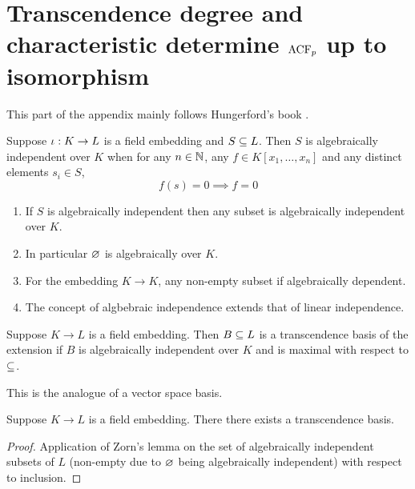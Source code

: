 \section{Transcendence degree and characteristic
determine \texorpdfstring{$\operatorname{ACF}_p$}{TEXT} up to isomorphism}
This part of the appendix mainly follows Hungerford's book \cite{hungerford}.
\begin{dfn}
    Suppose $\iota: K \to L$ is a field embedding
    and $S \subseteq L$.
    Then $S$ is algebraically independent over $K$
    when for any $n \in \mathbb{N}$, any $f \in K[x_1,\dots, x_n]$
    and any distinct elements $s_i \in S$, 
    \[f(s) = 0 \implies f = 0\]
\end{dfn}

\begin{rmk}
    \begin{enumerate}
        \item If $S$ is algebraically independent then any subset is 
        algebraically independent over $K$.
        \item In particular $\varnothing$ is algebraically over $K$.
        \item For the embedding $K \to K$, any non-empty subset if 
            algebraically dependent.
        \item The concept of algbebraic independence extends that of 
            linear independence.
    \end{enumerate}
\end{rmk}

\begin{dfn}
    Suppose $K \to L$ is a field embedding.
    Then $B \subseteq L$ is a transcendence basis of the extension
    if $B$ is algebraically independent over $K$ and is maximal
    with respect to $\subseteq$.
\end{dfn}
\begin{rmk}
    This is the analogue of a vector space basis.
\end{rmk}

\begin{prop}
    Suppose $K \to L$ is a field embedding.
    There there exists a transcendence basis.
\end{prop}
\begin{proof}
    Application of Zorn's lemma on the set of algebraically independent 
    subsets of $L$ (non-empty due to $\varnothing$ being algebraically independent)
    with respect to inclusion.
\end{proof}

